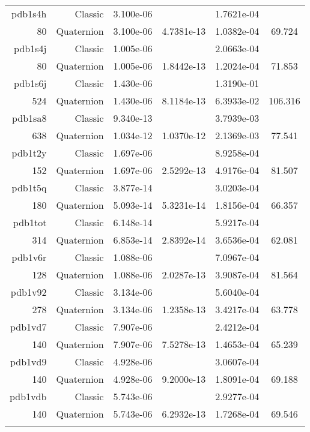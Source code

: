 \begin{xltabular}{\textwidth}{r|rS[table-format=1.3e+2]S[table-format=1.4e+2]S[table-format=1.4e+2]S[table-format=-1.3]}
pdb1s4h & Classic & 3.100e-06 &  & 1.7621e-04 & \\
80 & Quaternion & 3.100e-06 & 4.7381e-13 & 1.0382e-04 & 69.724\\  \addlinespace
pdb1s4j & Classic & 1.005e-06 &  & 2.0663e-04 & \\
80 & Quaternion & 1.005e-06 & 1.8442e-13 & 1.2024e-04 & 71.853\\  \addlinespace
pdb1s6j & Classic & 1.430e-06 &  & 1.3190e-01 & \\
524 & Quaternion & 1.430e-06 & 8.1184e-13 & 6.3933e-02 & 106.316\\  \addlinespace
pdb1sa8 & Classic & 9.340e-13 &  & 3.7939e-03 & \\
638 & Quaternion & 1.034e-12 & 1.0370e-12 & 2.1369e-03 & 77.541\\  \addlinespace
pdb1t2y & Classic & 1.697e-06 &  & 8.9258e-04 & \\
152 & Quaternion & 1.697e-06 & 2.5292e-13 & 4.9176e-04 & 81.507\\  \addlinespace
pdb1t5q & Classic & 3.877e-14 &  & 3.0203e-04 & \\
180 & Quaternion & 5.093e-14 & 5.3231e-14 & 1.8156e-04 & 66.357\\  \addlinespace
pdb1tot & Classic & 6.148e-14 &  & 5.9217e-04 & \\
314 & Quaternion & 6.853e-14 & 2.8392e-14 & 3.6536e-04 & 62.081\\  \addlinespace
pdb1v6r & Classic & 1.088e-06 &  & 7.0967e-04 & \\
128 & Quaternion & 1.088e-06 & 2.0287e-13 & 3.9087e-04 & 81.564\\  \addlinespace
pdb1v92 & Classic & 3.134e-06 &  & 5.6040e-04 & \\
278 & Quaternion & 3.134e-06 & 1.2358e-13 & 3.4217e-04 & 63.778\\  \addlinespace
pdb1vd7 & Classic & 7.907e-06 &  & 2.4212e-04 & \\
140 & Quaternion & 7.907e-06 & 7.5278e-13 & 1.4653e-04 & 65.239\\  \addlinespace
pdb1vd9 & Classic & 4.928e-06 &  & 3.0607e-04 & \\
140 & Quaternion & 4.928e-06 & 9.2000e-13 & 1.8091e-04 & 69.188\\  \addlinespace
pdb1vdb & Classic & 5.743e-06 &  & 2.9277e-04 & \\
140 & Quaternion & 5.743e-06 & 6.2932e-13 & 1.7268e-04 & 69.546\\  \addlinespace

\end{xltabular}
